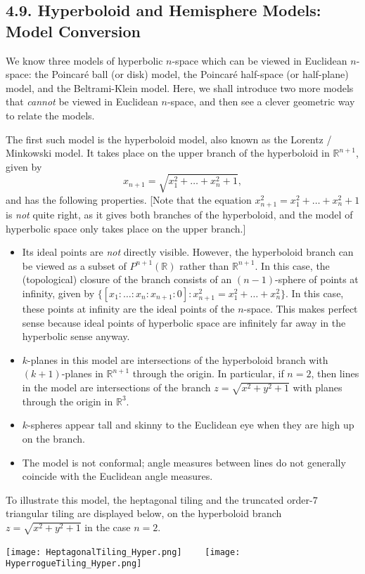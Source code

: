 \documentclass[leqno]{book}
\begin{document}
\subsection*{4.9. Hyperboloid and Hemisphere Models: Model Conversion}
We know three models of hyperbolic $n$-space which can be viewed in Euclidean $n$-space: the Poincar\'e ball (or disk) model, the Poincar\'e half-space (or half-plane) model, and the Beltrami-Klein model.  Here, we shall introduce two more models that \emph{cannot} be viewed in Euclidean $n$-space, and then see a clever geometric way to relate the models.

The first such model is the hyperboloid model, also known as the Lorentz / Minkowski model.  It takes place on the upper branch of the hyperboloid in $\mathbb R^{n+1}$, given by
$$x_{n+1}=\sqrt{x_1^2+\dots+x_n^2+1},$$
and has the following properties.  [Note that the equation $x_{n+1}^2=x_1^2+\dots+x_n^2+1$ is \emph{not} quite right, as it gives both branches of the hyperboloid, and the model of hyperbolic space only takes place on the upper branch.]
\begin{itemize}
\item Its ideal points are \emph{not} directly visible.  However, the hyperboloid branch can be viewed as a subset of $P^{n+1}(\mathbb R)$ rather than $\mathbb R^{n+1}$.  In this case, the (topological) closure of the branch consists of an $(n-1)$-sphere of points at infinity, given by $\{[x_1:\dots:x_n:x_{n+1}:0]:x_{n+1}^2=x_1^2+\dots+x_n^2\}$.  In this case, these points at infinity are the ideal points of the $n$-space.  This makes perfect sense because ideal points of hyperbolic space are infinitely far away in the hyperbolic sense anyway.

\item $k$-planes in this model are intersections of the hyperboloid branch with $(k+1)$-planes in $\mathbb R^{n+1}$ through the origin.  In particular, if $n=2$, then lines in the model are intersections of the branch $z=\sqrt{x^2+y^2+1}$ with planes through the origin in $\mathbb R^3$.

\item $k$-spheres appear tall and skinny to the Euclidean eye when they are high up on the branch.

\item The model is not conformal; angle measures between lines do not generally coincide with the Euclidean angle measures.
\end{itemize}
To illustrate this model, the heptagonal tiling and the truncated order-$7$ triangular tiling are displayed below, on the hyperboloid branch $z=\sqrt{x^2+y^2+1}$ in the case $n=2$.
\begin{center}
\texttt{[image: HeptagonalTiling\_Hyper.png]}~~~~
\texttt{[image: HyperrogueTiling\_Hyper.png]}
\end{center}
\end{document}
